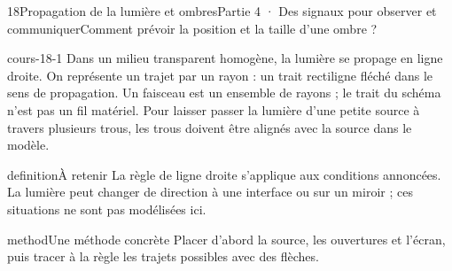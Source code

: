 \documentclass[12pt,twoside,openany]{book}
\begin{document}
\clearpage\pagestyle{otMain}
\begin{ouverture}[college4]{18}{Propagation de la lumière et ombres}{Partie 4 · Des signaux pour observer et communiquer}{Comment prévoir la position et la taille d’une ombre ?}
\end{ouverture}
\label{ch-18-cours-1}
\label{ess-18}
\begin{pcFiche}{cours-18-1}
Dans un milieu transparent homogène, la lumière se propage en ligne droite. On représente un trajet par un rayon : un trait rectiligne fléché dans le sens de propagation. Un faisceau est un ensemble de rayons ; le trait du schéma n’est pas un fil matériel. Pour laisser passer la lumière d’une petite source à travers plusieurs trous, les trous doivent être alignés avec la source dans le modèle.\par
{}
\begin{pcEncadre}{definition}{À retenir}
La règle de ligne droite s’applique aux conditions annoncées. La lumière peut changer de direction à une interface ou sur un miroir ; ces situations ne sont pas modélisées ici.\par
\end{pcEncadre}
\begin{pcEncadre}{method}{Une méthode concrète}
Placer d’abord la source, les ouvertures et l’écran, puis tracer à la règle les trajets possibles avec des flèches.\par
\end{pcEncadre}
\end{pcFiche}
\label{ch-18-cours-2}
\end{document}

